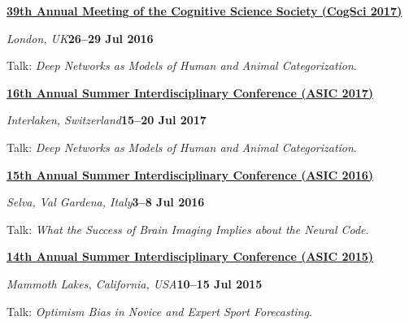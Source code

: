 \documentclass[10pt]{article}
\newenvironment{outerlist}[1][\enskip\textbullet]%
        {\begin{itemize}[#1]}{\end{itemize}%
         \vspace{-.6\baselineskip}}
\newenvironment{innerlist}[1][\enskip\textbullet]%
        {\begin{compactitem}[#1]}{\end{compactitem}}
\begin{document}
\textbf{\href{http://www.cognitivesciencesociety.org/conference/cogsci2017/}{ 39th Annual Meeting of the Cognitive Science Society (CogSci 2017)}}
\begin{outerlist}
\item[] \textit{London, UK}\hfill\textbf{26--29 Jul 2016}
\begin{innerlist}
\item Talk: \textit{Deep Networks as Models of Human and Animal Categorization}.
\end{innerlist}
\end{outerlist}
\vspace{10pt}

\textbf{\href{http://www.cogs.indiana.edu/asic/2017/index.shtml}{16th Annual Summer Interdisciplinary Conference (ASIC 2017)}}
\begin{outerlist}
\item[] \textit{Interlaken, Switzerland}\hfill\textbf{15--20 Jul 2017}
\begin{innerlist}
\item Talk: \textit{Deep Networks as Models of Human and Animal Categorization}.
\end{innerlist}
\end{outerlist}
\vspace{10pt}

\textbf{\href{http://www.cogs.indiana.edu/asic/2016/index.shtml}{15th Annual Summer Interdisciplinary Conference (ASIC 2016)}}
\begin{outerlist}
\item[] \textit{Selva, Val Gardena, Italy}\hfill\textbf{3--8 Jul 2016}
\begin{innerlist}
\item Talk: \textit{What the Success of Brain Imaging Implies about the Neural Code}.
\end{innerlist}
\end{outerlist}
\vspace{10pt}

\textbf{\href{http://www.cogs.indiana.edu/asic/2015/index.shtml}{14th Annual Summer Interdisciplinary Conference (ASIC 2015)}}
\begin{outerlist}
\item[] \textit{Mammoth Lakes, California, USA}\hfill\textbf{10--15 Jul 2015}
\begin{innerlist}
\item Talk: \textit{Optimism Bias in Novice and Expert Sport Forecasting}.
\end{innerlist}
\end{outerlist}
\vspace{10pt}
\end{document}
